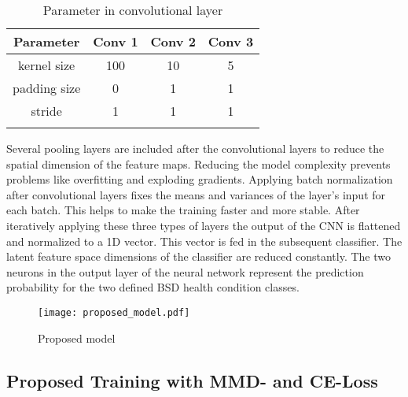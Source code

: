 \begin{longtable}{c c c c} 
\toprule
Parameter & Conv 1 & Conv 2 & Conv 3 \\
\midrule
kernel size & 100 & 10 & 5 \\

padding size & 0 & 1 & 1 \\

stride & 1 & 1 & 1 \\
\bottomrule
\caption {Parameter in convolutional layer}
\label {tab:parameter_conv}
\end{longtable}

Several pooling layers are included after the convolutional layers to reduce the spatial dimension of the feature maps. Reducing the model complexity prevents problems like overfitting and exploding gradients. Applying batch normalization after convolutional layers fixes the means and variances of the layer's input for each batch. This helps to make the training faster and more stable. After iteratively applying these three types of layers the output of the CNN is flattened and normalized to a 1D vector. This vector is fed in the subsequent classifier. The latent feature space dimensions of the classifier are reduced constantly. The two neurons in the output layer of the neural network represent the prediction probability for the two defined BSD health condition classes.


\begin{figure}[H]
  \centering
  \texttt{[image: proposed\_model.pdf]}
  \caption {Proposed model} \label{fig:proposed_model}
\end{figure}


\subsection{Proposed Training with MMD- and CE-Loss} \label{sec:Proposed_training}

